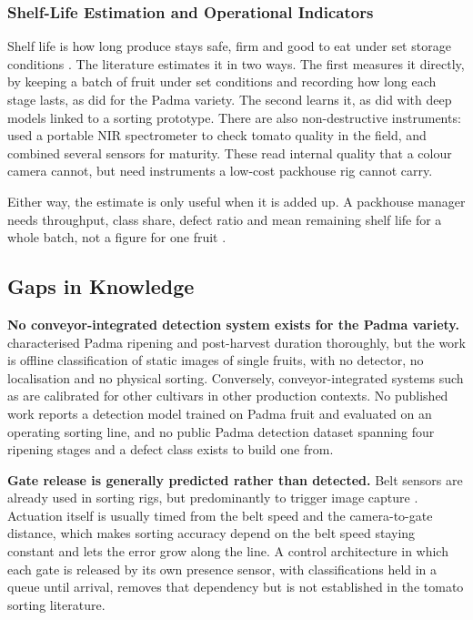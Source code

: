 \subsubsection{Shelf-Life Estimation and Operational Indicators}
\label{sec:shelflife_lit}

Shelf life is how long produce stays safe, firm and good to eat under set storage conditions \citep{tarlak2023}. The literature estimates it in two ways. The first measures it directly, by keeping a batch of fruit under set conditions and recording how long each stage lasts, as \citet{abekoon2024} did for the Padma variety. The second learns it, as \citet{geetha2025} did with deep models linked to a sorting prototype. There are also non-destructive instruments: \citet{borba2021} used a portable \acrfull{NIR} spectrometer to check tomato quality in the field, and \citet{liu2024} combined several sensors for maturity. These read internal quality that a colour camera cannot, but need instruments a low-cost packhouse rig cannot carry.

Either way, the estimate is only useful when it is added up. A packhouse manager needs throughput, class share, defect ratio and mean remaining shelf life for a whole batch, not a figure for one fruit \citep{geetha2025}.

\subsection{Gaps in Knowledge}
\label{sec:gaps}

\textbf{No conveyor-integrated detection system exists for the Padma variety.} \citet{abekoon2024} characterised Padma ripening and post-harvest duration thoroughly, but the work is offline classification of static images of single fruits, with no detector, no localisation and no physical sorting. Conversely, conveyor-integrated systems such as \citet{moya2025} are calibrated for other cultivars in other production contexts. No published work reports a detection model trained on Padma fruit and evaluated on an operating sorting line, and no public Padma detection dataset spanning four ripening stages and a defect class exists to build one from.

\textbf{Gate release is generally predicted rather than detected.} Belt sensors are already used in sorting rigs, but predominantly to trigger image capture \citep{moya2025}. Actuation itself is usually timed from the belt speed and the camera-to-gate distance, which makes sorting accuracy depend on the belt speed staying constant and lets the error grow along the line. A control architecture in which each gate is released by its own presence sensor, with classifications held in a queue until arrival, removes that dependency but is not established in the tomato sorting literature.

